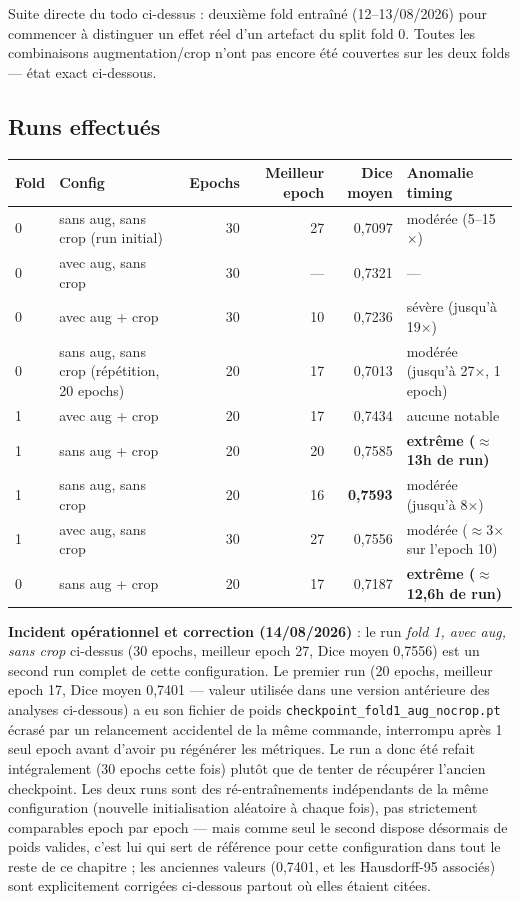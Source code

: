Suite directe du todo ci-dessus : deuxième fold entraîné (12--13/08/2026) pour
commencer à distinguer un effet réel d'un artefact du split fold 0. Toutes les
combinaisons augmentation/crop n'ont pas encore été couvertes sur les deux folds
--- état exact ci-dessous.

\subsection{Runs effectués}

\begin{center}
\begin{tabular}{llrrrl}
\toprule
Fold & Config & Epochs & Meilleur epoch & Dice moyen & Anomalie timing \\
\midrule
0 & sans aug, sans crop (run initial) & 30 & 27 & 0,7097 & modérée (5--15$\times$) \\
0 & avec aug, sans crop & 30 & --- & 0,7321 & --- \\
0 & avec aug + crop & 30 & 10 & 0,7236 & sévère (jusqu'à 19$\times$) \\
0 & sans aug, sans crop (répétition, 20 epochs) & 20 & 17 & 0,7013 & modérée (jusqu'à 27$\times$, 1 epoch) \\
1 & avec aug + crop & 20 & 17 & 0,7434 & aucune notable \\
1 & sans aug + crop & 20 & 20 & 0,7585 & \textbf{extrême ($\approx$13h de run)} \\
1 & sans aug, sans crop & 20 & 16 & \textbf{0,7593} & modérée (jusqu'à 8$\times$) \\
1 & avec aug, sans crop & 30 & 27 & 0,7556 & modérée ($\approx$3$\times$ sur l'epoch 10) \\
0 & sans aug + crop & 20 & 17 & 0,7187 & \textbf{extrême ($\approx$12,6h de run)} \\
\bottomrule
\end{tabular}
\end{center}

\textbf{Incident opérationnel et correction (14/08/2026)} : le run \emph{fold 1, avec
aug, sans crop} ci-dessus (30 epochs, meilleur epoch 27, Dice moyen 0,7556) est un
second run complet de cette configuration. Le premier run (20 epochs, meilleur epoch
17, Dice moyen 0,7401 --- valeur utilisée dans une version antérieure des analyses
ci-dessous) a eu son fichier de poids \texttt{checkpoint\_fold1\_aug\_nocrop.pt}
écrasé par un relancement accidentel de la même commande, interrompu après 1 seul
epoch avant d'avoir pu régénérer les métriques. Le run a donc été refait intégralement
(30 epochs cette fois) plutôt que de tenter de récupérer l'ancien checkpoint. Les deux
runs sont des ré-entraînements indépendants de la même configuration (nouvelle
initialisation aléatoire à chaque fois), pas strictement comparables epoch par epoch
--- mais comme seul le second dispose désormais de poids valides, c'est lui qui sert
de référence pour cette configuration dans tout le reste de ce chapitre ; les anciennes
valeurs (0,7401, et les Hausdorff-95 associés) sont explicitement corrigées ci-dessous
partout où elles étaient citées.

